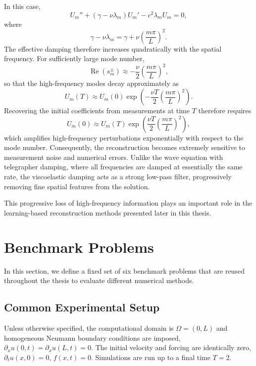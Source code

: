 \documentclass{Configuration_Files/PoliMi3i_thesis}
\begin{document}
In this case,
\begin{equation*}
U_m''
+
(\gamma-\nu\lambda_m)U_m'
-
c^2\lambda_mU_m
=
0,
\end{equation*}
where
\begin{equation*}
\gamma-\nu\lambda_m
=
\gamma
+
\nu
\left(\frac{m\pi}{L}\right)^2.
\end{equation*}
The effective damping therefore increases quadratically with the spatial frequency. For sufficiently large mode number,
\begin{equation*}
\operatorname{Re}(s_m^\pm)
\approx
-\frac{\nu}{2}
\left(\frac{m\pi}{L}\right)^2,
\end{equation*}
so that the high-frequency modes decay approximately as
\begin{equation*}
U_m(T)
\approx
U_m(0)
\exp\!\left(
-\frac{\nu T}{2}
\left(\frac{m\pi}{L}\right)^2
\right).
\end{equation*}
Recovering the initial coefficients from measurements at time \(T\) therefore requires
\begin{equation*}
U_m(0)
\approx
U_m(T)
\exp\!\left(
\frac{\nu T}{2}
\left(\frac{m\pi}{L}\right)^2
\right),
\end{equation*}
which amplifies high-frequency perturbations exponentially with respect to the mode number. Consequently, the reconstruction becomes extremely sensitive to measurement noise and numerical errors. Unlike the wave equation with telegrapher damping, where all frequencies are damped at essentially the same rate, the viscoelastic damping acts as a strong low-pass filter, progressively removing fine spatial features from the solution.

This progressive loss of high-frequency information plays an important role in the learning-based reconstruction methods presented later in this thesis.

\section{Benchmark Problems}
\label{sec:benchmark_problems}
In this section, we define a fixed set of six benchmark problems that are reused throughout the thesis to evaluate different numerical methods.

\subsection{Common Experimental Setup}
Unless otherwise specified, the computational domain is $\Omega=(0,L)$ and homogeneous Neumann boundary conditions are imposed, $\partial_xu(0,t)=\partial_xu(L,t)=0$. The initial velocity and forcing are identically zero, $\partial_tu(x,0)=0$, $f(x,t)=0$. Simulations are run up to a final time $T=2$.
\end{document}
